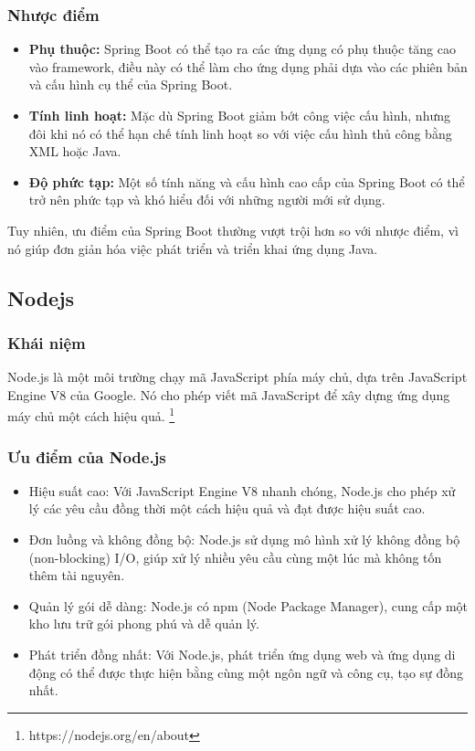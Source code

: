 \subsubsection{Nhược điểm}
\begin{itemize}
    \item \textbf{Phụ thuộc:} Spring Boot có thể tạo ra các ứng dụng có phụ thuộc tăng cao vào framework, điều này có thể làm cho ứng dụng phải dựa vào các phiên bản và cấu hình cụ thể của Spring Boot.
    \item \textbf{Tính linh hoạt:} Mặc dù Spring Boot giảm bớt công việc cấu hình, nhưng đôi khi nó có thể hạn chế tính linh hoạt so với việc cấu hình thủ công bằng XML hoặc Java.
    \item \textbf{Độ phức tạp:} Một số tính năng và cấu hình cao cấp của Spring Boot có thể trở nên phức tạp và khó hiểu đối với những người mới sử dụng.
\end{itemize}
\noindent Tuy nhiên, ưu điểm của Spring Boot thường vượt trội hơn so với nhược điểm, vì nó giúp đơn giản hóa việc phát triển và triển khai ứng dụng Java.

\subsection{Nodejs}
\subsubsection{Khái niệm}
\noindent Node.js là một môi trường chạy mã JavaScript phía máy chủ, dựa trên JavaScript Engine V8 của Google. Nó cho phép viết mã JavaScript để xây dựng ứng dụng máy chủ một cách hiệu quả. \footnote{https://nodejs.org/en/about}
\subsubsection{Ưu điểm của Node.js}
\begin{itemize}
    \item Hiệu suất cao: Với JavaScript Engine V8 nhanh chóng, Node.js cho phép xử lý các yêu cầu đồng thời một cách hiệu quả và đạt được hiệu suất cao.
    \item Đơn luồng và không đồng bộ: Node.js sử dụng mô hình xử lý không đồng bộ (non-blocking) I/O, giúp xử lý nhiều yêu cầu cùng một lúc mà không tốn thêm tài nguyên.
    \item Quản lý gói dễ dàng: Node.js có npm (Node Package Manager), cung cấp một kho lưu trữ gói phong phú và dễ quản lý.
    \item Phát triển đồng nhất: Với Node.js, phát triển ứng dụng web và ứng dụng di động có thể được thực hiện bằng cùng một ngôn ngữ và công cụ, tạo sự đồng nhất.
\end{itemize}
